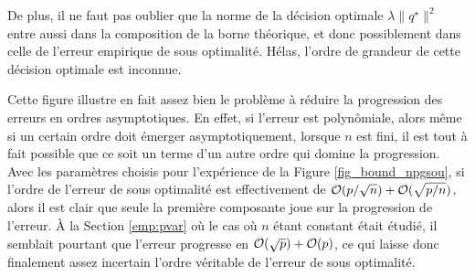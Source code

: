 De plus, il ne faut pas oublier que la norme de la décision optimale
$\lambda\|q^\star\|^2$ entre aussi dans la composition de la borne théorique, et donc possiblement
dans celle de l'erreur empirique de sous optimalité. Hélas, l'ordre de grandeur de cette
décision optimale est inconnue.

Cette figure illustre en fait assez bien le problème à réduire la progression des erreurs
en ordres asymptotiques. En effet, si l'erreur est polynômiale, alors même si un certain
ordre doit émerger asymptotiquement, lorsque $n$ est fini, il est tout à fait possible que
ce soit un terme d'un autre ordre qui domine la progression.  Avec les paramètres choisis
pour l'expérience de la Figure \ref{fig_bound_npgsou}, si l'ordre de l'erreur de sous
optimalité est effectivement de $\mathcal O(p/\sqrt{n}) + \mathcal O(\sqrt{p/n})$, alors il est
clair que seule la première composante joue sur la progression de l'erreur. À la Section
\ref{emp:pvar} où le cas où $n$ étant constant était étudié, il semblait pourtant que
l'erreur progresse en $\mathcal O(\sqrt{p}) + \mathcal O(p)$, ce qui laisse donc finalement assez
incertain l'ordre véritable de l'erreur de sous optimalité.


